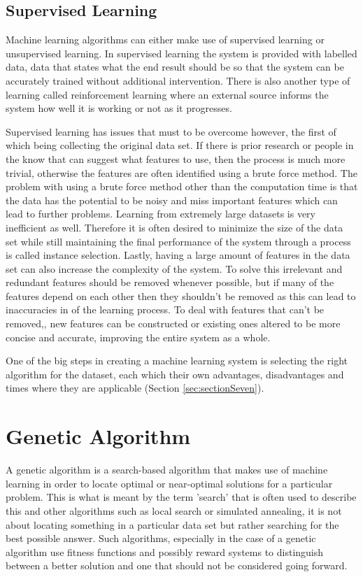 \subsection{Supervised Learning} \label{sec:supervisedLearning}

Machine learning algorithms can either make use of supervised learning or unsupervised learning.  In supervised learning the system is provided with labelled data, data that states what the end result should be so that the system can be accurately trained without additional intervention.  There is also another type of learning called reinforcement learning where an external source informs the system how well it is working or not as it progresses.

Supervised learning has issues that must to be overcome however, the first of which being collecting the original data set.  If there is prior research or people in the know that can suggest what features to use, then the process is much more trivial, otherwise the features are often identified using a brute force method.  The problem with using a brute force method other than the computation time is that the data has the potential to be noisy and miss important features which can lead to further problems.  Learning from extremely large datasets is very inefficient as well.  Therefore it is often desired to minimize the  size of the data set while still maintaining the final performance of the system through a process is called instance selection.  Lastly, having a large amount of features in the data set can also increase the complexity of the system.  To solve this irrelevant and redundant features should be removed whenever possible, but if many of the features depend on each other then they shouldn't be removed as this can lead to inaccuracies in of the learning process.  To deal with features that can't be removed,, new features can be constructed or existing ones altered to be more concise and accurate, improving the entire system as a whole.

One of the big steps in creating a machine learning system is selecting the right algorithm for the dataset, each which their own advantages, disadvantages and times where they are applicable (Section \ref{sec:sectionSeven}). 

\section{Genetic Algorithm} \label{sec:genAlgorithm}

A genetic algorithm is a search-based algorithm that makes use of machine learning in order to locate optimal or near-optimal solutions for a particular problem.  This is what is meant by the term 'search' that is often used to describe this and other algorithms such as local search or simulated annealing, it is not about locating something in a particular data set but rather searching for the best possible answer.  Such algorithms, especially in the case of a genetic algorithm use fitness functions and possibly reward systems to distinguish between a better solution and one that should not be considered going forward. \cite{searchBasedSoftwareEngineering}

